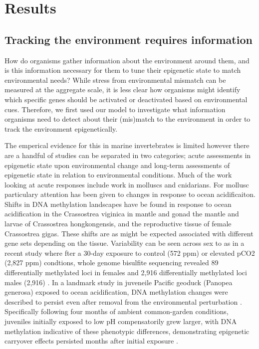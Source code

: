 \documentclass{article}
\begin{document}
\clearpage

\section{Results}

\subsection{Tracking the environment requires information}
How do organisms gather information about the environment around them, and is this information necessary for them to tune their epigenetic state to match environmental needs? While stress from environmental mismatch can be measured at the aggregate scale, it is less clear how organisms might identify which specific genes should be activated or deactivated based on environmental cues. Therefore, we first used our model to investigate what information organisms need to detect about their (mis)match to the environment in order to track the environment epigenetically.


The emperical evidence for this in marine invertebrates is limited however there are a handful of studies can be separated in two categories; acute assessments in epigenetic state upon environmental change and long-term assessments of epigenetic state in relation to environmental conditions. Much of the work looking at acute responses include work in molluscs and cnidarians. For mollusc particulary attention has been given to changes in response to ocean acidificaiton. Shifts in DNA methylation landscapes have be found in response to ocean acidification in the Crassostrea viginica in mantle \cite{10.3389/fmars.2020.566419} and gonad \cite{0.3389/fmars.2020.00225} the mantle \cite{10.1111/gcb.15675} and larvae \cite{10.1016/j.marenvres.2020.105217, 10.1111/mec.16751} of Crassostrea hongkongensis, and the reproductive tissue \cite{10.1186/s12864-022-08781-5} of female Crassostrea gigas. These shifts are as might be expected associated with different gene sets depending on the tissue. Variability can be seen across sex to as in a recent study where fter a 30-day exposure to control (572 ppm) or elevated pCO2 (2,827 ppm) condtions, whole genome bisulfite sequencing revealed 89 differentially methylated loci in females and 2,916 differentially methylated loci males (2,916) \cite{10.1101/2024.04.04.588108}. In a landmark study in juveneile Pacific geoduck (Panopea generosa) exposed to ocean acidification, DNA methylation changes were described to persist even after removal from the environmental perturbation \cite{10.1101/2022.06.24.497506}. Specifically following four months of ambient common-garden conditions, juveniles initially exposed to low pH compensatorily grew larger, with DNA methylation indicative of these phenotypic differences, demonstrating epigenetic carryover effects persisted months after initial exposure \cite{10.1101/2022.06.24.497506}. 
\end{document}
